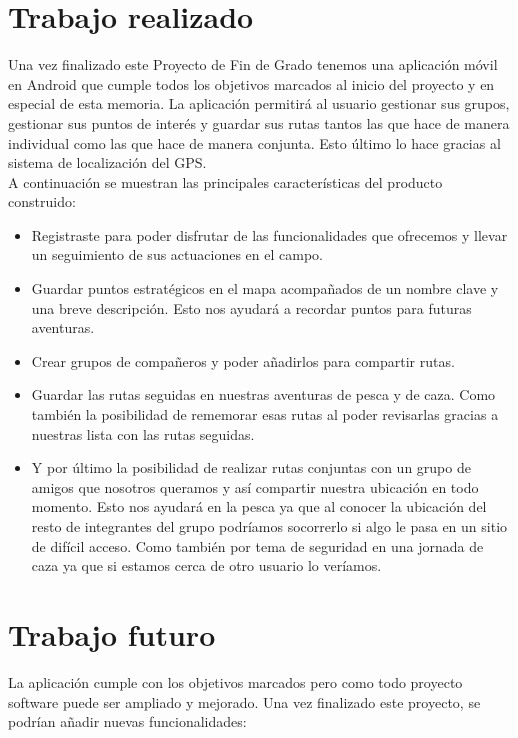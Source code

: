 

\section{Trabajo realizado}
Una vez finalizado este Proyecto de Fin de Grado tenemos una aplicación móvil en Android que cumple todos los objetivos marcados al inicio del proyecto y en especial de esta memoria. La aplicación permitirá al usuario gestionar sus grupos, gestionar sus puntos de interés y guardar sus rutas tantos las que hace de manera individual como las que hace de manera conjunta. Esto último lo hace gracias al sistema de localización del GPS.\\


A continuación se muestran las principales características del producto construido: 

\begin{itemize}
\item Registraste para poder disfrutar de las funcionalidades que ofrecemos y llevar un seguimiento de sus actuaciones en el campo.
\item Guardar puntos estratégicos en el mapa acompañados de un nombre clave y una breve descripción. Esto nos ayudará a recordar puntos para futuras aventuras. 
\item Crear grupos de compañeros y poder añadirlos para compartir rutas.
\item Guardar las rutas seguidas en nuestras aventuras de pesca y de caza. Como también la posibilidad de rememorar esas rutas al poder revisarlas gracias a nuestras lista con las rutas seguidas.
\item Y por último la posibilidad de realizar rutas conjuntas con un grupo de amigos que nosotros queramos y así compartir nuestra ubicación en todo momento. Esto nos ayudará en la pesca ya que al conocer la ubicación del resto de integrantes del grupo podríamos socorrerlo si algo le pasa en un sitio de difícil acceso. Como también por tema de seguridad en una jornada de caza ya que si estamos cerca de otro usuario lo veríamos.
\end{itemize}  

\section{Trabajo futuro}
 La aplicación cumple con los objetivos marcados pero como todo proyecto software puede ser ampliado y mejorado. Una vez finalizado este proyecto, se podrían añadir nuevas funcionalidades:



